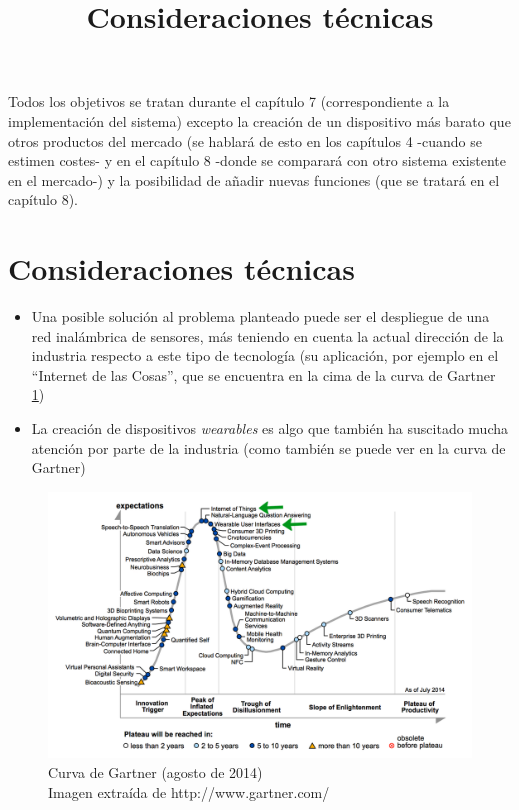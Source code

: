 Todos los objetivos se tratan durante el capítulo 7 (correspondiente a la implementación del sistema) excepto
la creación de un dispositivo más barato que otros productos del mercado (se hablará de esto en los capítulos 4 -cuando se
estimen costes- y en el capítulo 8 -donde se comparará con otro sistema existente en el mercado-) y la posibilidad de añadir
nuevas funciones (que se tratará en el capítulo 8).


\title{Consideraciones técnicas}
\section{Consideraciones técnicas}

  \begin{itemize}
    \item Una posible solución al problema planteado puede ser el despliegue de una red inalámbrica de sensores,
    más teniendo en cuenta la actual dirección de la industria respecto a este tipo de tecnología (su aplicación,
    por ejemplo en el “Internet de las Cosas”, que se encuentra en la cima de la curva de Gartner \ref{fig:curvaG})
    \item La creación de dispositivos \textit{wearables} es algo que también ha suscitado
    mucha atención por parte de la industria (como también se puede ver en la curva de Gartner)
  \end{itemize}

  \begin{figure}[htb]
  \centering
  \captionsetup{justification=centering}
  \includegraphics[width=1\textwidth]{./imagenes/gartner}
  \caption{Curva de Gartner (agosto de 2014)\\
    \scriptsize{Imagen extraída de http://www.gartner.com/}
  \cite{gartnercurve}} \label{fig:curvaG}
  \end{figure}

